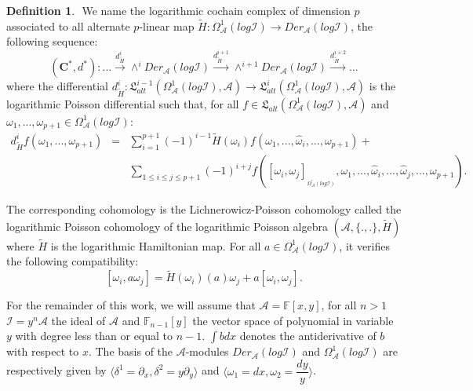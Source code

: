 \documentclass[a4paper, 12pt,oneside,reqno]{amsart}
\theoremstyle{definition}
\newtheorem{definition}[theorem]{Definition}
\begin{document}
\begin{definition} $\label{5}$
  We name the logarithmic cochain complex of dimension $p$ associated to all alternate $p$-linear map $\tilde{H}: \Omega^{1}_{\mathcal{A}}(log \mathcal{I}) \longrightarrow Der_{\mathcal{A}}(log \mathcal{I})$, the following sequence:
  \begin{displaymath} \label{CC1}
       (\textbf{C}^{*},d^{*}):    ...\stackrel{d^{i}_{\tilde{H}}}{\longrightarrow}\wedge^{i}Der_{\mathcal{A}}(log \mathcal{I})
              \stackrel{d^{i+1}_{\tilde{H}}}{\longrightarrow} \wedge^{i+1}Der_{\mathcal{A}}(log \mathcal{I}) \stackrel{d^{i+2}_{\tilde{H}}}{\longrightarrow} ...
              \end{displaymath}
        where the differential 
                $d^{i}_{\tilde{H}}:  \mathfrak{L}^{i-1}_{alt}( \Omega^{1}_{\mathcal{A}}(log\mathcal{I}), \mathcal{A})
                \longrightarrow \mathfrak{L}_{alt}^{i}( \Omega^{1}_{\mathcal{A}}(log\mathcal{I}), \mathcal{A})$ is the logarithmic Poisson differential such that,
                for all  $f \in \mathfrak{L}_{alt}(\Omega^{1}_{\mathcal{A}}(log\mathcal{I}), \mathcal{A})$
                and $ \omega_{1},...,\omega_{p+1}\in \Omega^{1}_{\mathcal{A}}(log\mathcal{I})$:
                \begin{eqnarray*}
                  d^{i}_{\tilde{H}}f(\omega_{1},...,\omega_{p+1})
                   &=& \sum_{i=1}^{p+1}(-1)^{i-1}\tilde{H}(\omega_{i})f( \omega_{1},...,\hat{\omega}_{i},...,\omega_{p+1})+ \label{*} ~~~~~~~~~~~~~~~~~~  \\
                   & &\sum_{1\leq i\leq j \leq p+1} (-1)^{i+j}f([\omega_{i}, \omega_{j}]_{_{\Omega^{^{1}}_{\mathcal{A}}(log\mathcal{I})}},
                   \omega_{1},...,\hat{\omega}_{i},
                   ...,\hat{\omega}_{j},...,\omega_{p+1}).
                \end{eqnarray*}
                      
  \end{definition}
  The corresponding cohomology is the Lichnerowicz-Poisson cohomology  called the logarithmic Poisson cohomology of the logarithmic Poisson algebra $(\mathcal{A}, \{.,.\}, \tilde{H})$
          where $\tilde{H}$ is the  logarithmic Hamiltonian map. For all $a\in \Omega^{1}_{\mathcal{A}}(log \mathcal{I})$, it verifies the following compatibility:
            $$ [\omega_{i},a\omega_{j}]= \tilde{H}(\omega_{i})(a)\omega_{j} + a[\omega_{i},\omega_{j}].$$

For the remainder of this work, we will assume that $\mathcal{A} = \mathbb{F}[x,y]$, for all $n>1$ $\mathcal{I}=y^n\mathcal{A}$ the ideal of $\mathcal{A}$ and $\mathbb{F}_{n-1}[y]$ the vector space of  polynomial in variable $y$ with degree less than or equal to $n-1$.  
$\int b dx$ denotes the antiderivative of $b$ with respect to $x$.
The basis of the $\mathcal{A}$-modules $Der_{\mathcal{A}}(log \mathcal{I}) $  and $\Omega_{\mathcal{A}}^{1}(log \mathcal{I}) $  are respectively given by $\langle \delta^{1} = \partial_{x}, \delta^{2} = y\partial_{y} \rangle$ and $\langle\omega_{1}=dx, \omega_{2}=\dfrac{dy}{y} \rangle$.
\end{document}
